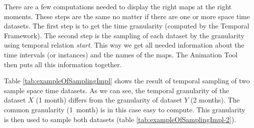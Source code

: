 \documentclass[a4paper,12pt,oneside]{book}
\newcommand{\tf}{Temporal Framework\xspace}
\newcommand{\at}{Animation Tool\xspace}
\begin{document}
There are a few computations needed to display the right maps at the right moments.
These steps are the same no matter if there are one or more space time datasets.
The first step is to get the time granularity (computed by the \tf).  
The second step is the sampling of each dataset by the granularity using temporal relation \emph{start}.
This way we get all needed information about the time intervals (or instances) and the names of the maps.
The \at then puts all this information together.

Table \ref{tab:exampleOfSamplingImpl} shows the result of temporal sampling of two sample space time datasets.
As we can see, the temporal granularity of the dataset $X$ (1 month) differs from the granularity of dataset $Y$ (2 months).
The common granularity (1~month) is in this case easy to compute.
This granularity is then used to sample both datasets (table \ref{tab:exampleOfSamplingImpl-2}).
\end{document}
